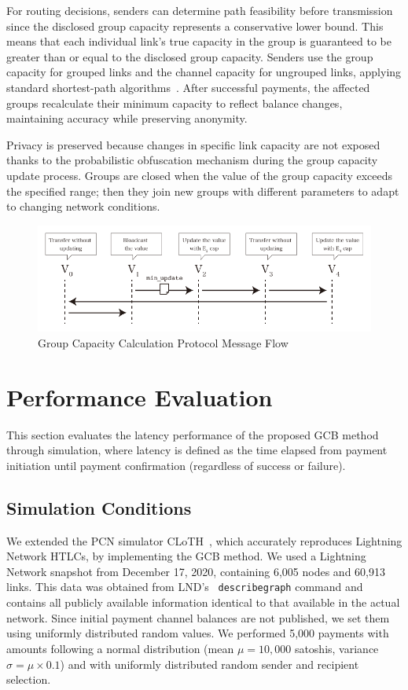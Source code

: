 \documentclass[conference]{IEEEtran}
\begin{document}
For routing decisions, senders can determine path feasibility before transmission since the disclosed group capacity represents a conservative lower bound.
This means that each individual link's true capacity in the group is guaranteed to be greater than or equal to the disclosed group capacity.
Senders use the group capacity for grouped links and the channel capacity for ungrouped links, applying standard shortest-path algorithms~\cite{lnd,eclair,clightning}.
After successful payments, the affected groups recalculate their minimum capacity to reflect balance changes, maintaining accuracy while preserving anonymity.

Privacy is preserved because changes in specific link capacity are not exposed thanks to the probabilistic obfuscation mechanism during the group capacity update process.
Groups are closed when the value of the group capacity exceeds the specified range; then they join new groups with different parameters to adapt to changing network conditions.

\begin{figure}[htbp]
	\centerline{\includegraphics[width=\linewidth]{fig/group_cap_handover}}
	\caption{Group Capacity Calculation Protocol Message Flow}
	\label{fig:group_cap_handover}
\end{figure}

\section{Performance Evaluation}

This section evaluates the latency performance of the proposed GCB method through simulation, where latency is defined as the time elapsed from payment initiation until payment confirmation (regardless of success or failure).

\subsection{Simulation Conditions}
We extended the PCN simulator CLoTH~\cite{CONOSCENTI2021100717}, which accurately reproduces Lightning Network HTLCs, by implementing the GCB method.
We used a Lightning Network snapshot from December 17, 2020, containing 6,005 nodes and 60,913 links.
This data was obtained from LND's~\cite{lnd} \texttt{describegraph} command and contains all publicly available information identical to that available in the actual network.
Since initial payment channel balances are not published, we set them using uniformly distributed random values.
We performed 5,000 payments with amounts following a normal distribution (mean $\mu = 10,000$ satoshis, variance $\sigma = \mu \times 0.1$) and with uniformly distributed random sender and recipient selection.
\end{document}
